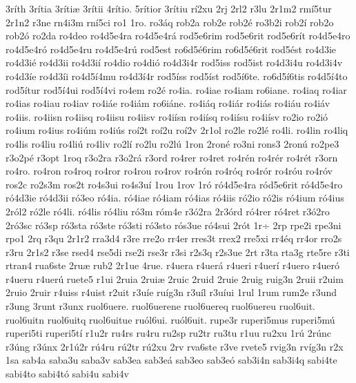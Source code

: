 {3r^^edth
3r^^edtia
3r^^edti^^e6
3r^^edtii
4r^^edtio.
5r^^edtior
3r^^edtiu
r^^ed2xu
2rj
2rl2
r3lu
2r1m2
rm^^ed5tur
2r1n2
r3ne
rn4i3m
rn^^ed5ci
ro1
1ro.
ro3^^e1q
rob2a
rob2e
rob2^^e9
ro3b2i
rob2^^ed
rob2o
rob2^^f3
ro2da
ro4deo
ro4d5e4ra
ro4d5e4r^^e1
rod5e6rim
rod5e6rit
rod5e6r^^edt
ro4d5e4ro
ro4d5e4r^^f3
ro4d5e4ru
ro4d5e4r^^fa
rod5est
ro6d5^^e96rim
ro6d5^^e96rit
rod5^^e9st
ro4d3ie
ro4d3i^^e9
ro4d3ii
ro4d3i^^ed
ro4dio
ro4di^^f3
ro4d3i4r
rod5iss
rod5ist
ro4d3i4u
ro4d3i4v
ro4d3^^ede
ro4d3^^edi
ro4d5^^ed4mu
ro4d3^^ed4r
rod5^^edss
rod5^^edst
rod5^^ed6te.
ro6d5^^ed6tis
ro4d5^^ed4to
rod5^^edtur
rod5^^ed4ui
rod5^^ed4vi
ro4em
ro2^^e9
ro4ia.
ro4iae
ro4iam
ro6iane.
ro4iaq
ro4iar
ro4ias
ro4iau
ro4iav
ro4i^^e1e
ro4i^^e1m
ro6i^^e1ne.
ro4i^^e1q
ro4i^^e1r
ro4i^^e1s
ro4i^^e1u
ro4i^^e1v
ro4iis.
ro4iisn
ro4iisq
ro4iisu
ro4iisv
ro4i^^edsn
ro4i^^edsq
ro4i^^edsu
ro4i^^edsv
ro2io
ro2i^^f3
ro4ium
ro4ius
ro4i^^fam
ro4i^^fas
ro^^ed2t
ro^^ed2u
ro^^ed2v
2r1ol
ro2le
ro2l^^e9
ro4li.
ro4lin
ro4liq
ro4lis
ro4liu
ro4li^^fa
ro4liv
ro2l^^ed
ro2lu
ro2l^^fa
1ron
2ron^^e9
ro3ni
rons3
2ron^^fa
ro2pe3
r3o2p^^e9
r3opt
1roq
r3o2ra
r3o2r^^e1
r3ord
ro4rer
ro4ret
ro4r^^e9n
ro4r^^e9r
ro4r^^e9t
r3orn
ro4ro.
ro4ron
ro4roq
ro4ror
ro4rou
ro4rov
ro4r^^f3n
ro4r^^f3q
ro4r^^f3r
ro4r^^f3u
ro4r^^f3v
ros2c
ro2s3m
ros2t
ro4s3ui
ro4s3u^^ed
1rou
1rov
1r^^f3
r^^f34d5e4ra
r^^f3d5e6rit
r^^f34d5e4ro
r^^f34d3ie
r^^f34d3ii
r^^f33eo
r^^f34ia.
r^^f34iae
r^^f34iam
r^^f34ias
r^^f34iis
r^^f32io
r^^f32is
r^^f34ium
r^^f34ius
2r^^f3l2
r^^f32le
r^^f34li.
r^^f34lis
r^^f34liu
r^^f33m
r^^f3m4e
r3^^f32ra
2r3^^f3rd
r^^f34rer
r^^f34ret
r3^^f32ro
2r^^f33sc
r^^f33sp
r^^f33sta
r^^f33ste
r^^f33sti
r^^f33sto
r^^f3s3ue
r^^f34sui
2r^^f3t
1r^^f7
2rp
rpe2i
rpe3ni
rpo1
2rq
r3qu
2r1r2
rra3d4
r3re
rre2o
rr4er
rres3t
rrex2
rre5xi
rr4^^e9q
rr4or
rro2s
r3ru
2r1s2
r3se
rsed4
rse5di
rse2i
rse3r
r3si
r2s3q
r2s3ue
2rt
r3ta
rta3g
rte5re
r3ti
rtran4
rua6ste
2ru^^e6
rub2
2r1ue
4rue.
r4uera
r4uer^^e1
r4ueri
r4uer^^ed
r4uero
r4uer^^f3
r4ueru
r4uer^^fa
ruete5
r1ui
2ruia
2rui^^e6
2ruic
2ruid
2ruie
2ruig
ruig3n
2ruii
r2uim
2ruio
2ruir
r4uiss
r4uist
r2uit
r3u^^ede
ru^^edg3n
r3u^^edl
r3u^^edui
1rul
1rum
rum2e
r3und
r3ung
3runt
r3unx
ruol6uere.
ruol6uerene
ruol6uereq
ruol6uereu
ruol6uit.
ruol6uitn
ruol6uitq
ruol6uitue
ru^^f3l6ui.
ru^^f3l6uit.
rupe3r
ruperi5mus
ruperi5m^^fa
ruperi5ti
ruperi5t^^ed
r1u2r
ru4rs
ru4ru
ru2sp
ru2tr
ru3tu
r1uu
ru2xu
1r^^fa
2r^^fanc
r3^^fang
r3^^fanx
2r1^^fa2r
r^^fa4ru
r^^fa2tr
r^^fa2xu
2rv
rva6ste
r3ve
rvete5
rvig3n
rv^^edg3n
r2x
1sa
sab4a
saba3u
saba3v
sab3ea
sab3e^^e1
sab3eo
sab3e^^f3
sab3i4n
sab3i4q
sabi4te
sabi4to
sabi4t^^f3
sabi4u
sabi4v
}
